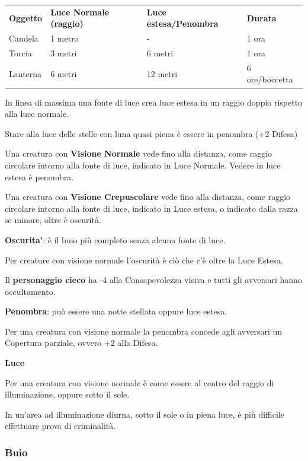 \documentclass[a4paper,11pt,twoside,openany]{book}
\begin{document}
{

\begin{tabular}{llll}
\toprule
\textbf{Oggetto} & \textbf{Luce Normale (raggio)} & \textbf{Luce estesa/Penombra} & \textbf{Durata}\tabularnewline
Candela & 1 metro & - & 1 ora\tabularnewline
Torcia & 3 metri & 6 metri & 1 ora\tabularnewline
Lanterna & 6 metri & 12 metri & 6 ore/boccetta\tabularnewline
\end{tabular}

\bigskip

In linea di massima una fonte di luce crea luce estesa in un raggio doppio rispetto alla luce normale.

Stare alla luce delle stelle con luna quasi piena è essere in penombra (+2 Difesa)

Una creatura con \textbf{Visione Normale} vede fino alla distanza, come raggio circolare intorno alla fonte di luce, indicato in Luce Normale. Vedere in luce estesa è penombra.

Una creatura con \textbf{Visione Crepuscolare} vede fino alla distanza, come raggio circolare intorno alla fonte di luce, indicato in Luce estesa, o indicato dalla razza se minore, oltre è oscurità.

\textbf{Oscurita'}: è il buio più completo senza alcuna fonte di luce.

Per creature con visione normale l'oscurità è ciò che c'è oltre la Luce Estesa.

Il \textbf{personaggio cieco} ha -4 alla Consapevolezza visiva e tutti gli avversari hanno occultamento.

\textbf{Penombra}: può essere una notte stellata oppure luce estesa.

Per una creatura con visione normale la penombra concede agli avversari
un Copertura parziale, ovvero +2 alla Difesa.

\textbf{Luce}

Per una creatura con visione normale è come essere al centro del raggio di illuminazione, oppure sotto il sole.

In un'area ad illuminazione diurna, sotto il sole o in piena luce, è più difficile effettuare prova di criminalità.

\subsubsection{Buio}

}
\end{document}
